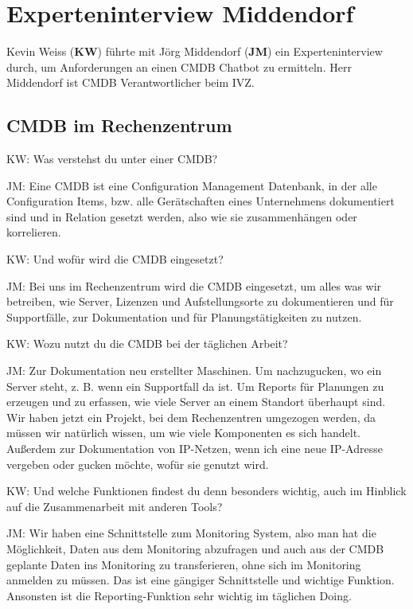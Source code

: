\chapter{Experteninterview Middendorf}\label{Interview_Middendorf}

Kevin Weiss (\textbf{KW}) führte mit Jörg Middendorf (\textbf{JM}) ein Experteninterview  durch, um Anforderungen an einen CMDB Chatbot zu ermitteln. Herr Middendorf ist CMDB Verantwortlicher beim IVZ.

\section*{CMDB im Rechenzentrum}

\begin{list}{X:}{\setlength{\labelsep}{5mm}}
\item[KW:] Was verstehst du unter einer CMDB? 
\item[JM:] Eine CMDB ist eine Configuration Management Datenbank, in der alle Configuration Items, bzw. alle Gerätschaften eines Unternehmens dokumentiert sind und in Relation gesetzt werden, also wie sie zusammenhängen oder korrelieren.
\item[KW:] Und wofür wird die CMDB eingesetzt?
\item[JM:] Bei uns im Rechenzentrum wird die CMDB eingesetzt, um alles was wir betreiben, wie Server, Lizenzen und Aufstellungsorte zu dokumentieren und für Supportfälle, zur Dokumentation und für Planungstätigkeiten zu nutzen.
\item[KW:] Wozu nutzt du die CMDB bei der täglichen Arbeit?
\item[JM:] Zur Dokumentation neu erstellter Maschinen. Um nachzugucken, wo ein Server steht, z. B. wenn ein Supportfall da ist. Um Reports für Planungen zu erzeugen und zu erfassen, wie viele Server an einem Standort überhaupt sind.\\ Wir haben jetzt ein Projekt, bei dem Rechenzentren umgezogen werden, da müssen wir natürlich wissen, um wie viele Komponenten es sich handelt. Außerdem zur Dokumentation von IP-Netzen, wenn ich eine neue IP-Adresse vergeben oder gucken möchte, wofür sie genutzt wird. 
\item[KW:] Und welche Funktionen findest du denn besonders wichtig, auch im Hinblick auf die Zusammenarbeit mit anderen Tools?
\item[JM:] Wir haben eine Schnittstelle zum Monitoring System, also man hat die Möglichkeit, Daten aus dem Monitoring abzufragen und auch aus der CMDB geplante Daten ins Monitoring zu transferieren, ohne sich im Monitoring anmelden zu müssen. Das ist eine gängiger Schnittstelle und wichtige Funktion. Ansonsten ist die Reporting-Funktion sehr wichtig im täglichen Doing.
\end{list}


